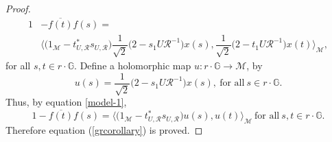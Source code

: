 \documentclass[12pt,reqno]{amsart}
\numberwithin{equation}{section}
\theoremstyle{definition}
\begin{document}
\begin{proof}
\begin{align}\label{model-1}
 1 & -  \overline{f(t)}f(s)= \\
 & \Bigg\langle  \bigg(1_{\mathcal{M}}-t_{U,\mathcal{R}}^{*}s_{U,\mathcal{R}}\bigg)\dfrac{1}{\sqrt{2}}\bigg(2-s_{1}U\mathcal{R}^{-1}\bigg)x(s),\dfrac{1}{\sqrt{2}}\bigg(2-t_{1}U\mathcal{R}^{-1}\bigg)x(t)\Bigg\rangle_{\mathcal{M}}, \nonumber
\end{align}
for all $s,t\in r\cdot\mathbb{G}$.
Define a holomorphic map 
$u:r\cdot \mathbb{G}\rightarrow \mathcal{M}$, by 
\begin{equation}
u(s) = \dfrac{1}{\sqrt{2}}\bigg(2-s_{1}U\mathcal{R}^{-1}\bigg)x(s), \ \text{for all} \ s \in r\cdot \mathbb{G}.
\end{equation}
Thus, by equation \eqref{model-1},
$$1-\overline{f(t)}f(s) = \Bigg\langle  \bigg(1_{\mathcal{M}}-t_{U,\mathcal{R}}^{*}s_{U,\mathcal{R}}\bigg)u(s),u(t)\Bigg\rangle_{\mathcal{M}}
\ \text{for all} \ s, t \in r\cdot \mathbb{G}.$$
Therefore equation (\ref{grcorollary}) is proved.\end{proof}
\end{document}
